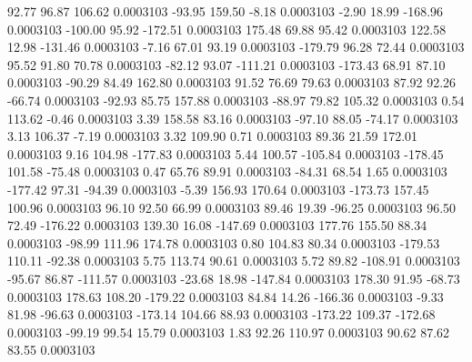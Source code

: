        92.77       96.87      106.62     0.0003103
      -93.95      159.50       -8.18     0.0003103
       -2.90       18.99     -168.96     0.0003103
     -100.00       95.92     -172.51     0.0003103
      175.48       69.88       95.42     0.0003103
      122.58       12.98     -131.46     0.0003103
       -7.16       67.01       93.19     0.0003103
     -179.79       96.28       72.44     0.0003103
       95.52       91.80       70.78     0.0003103
      -82.12       93.07     -111.21     0.0003103
     -173.43       68.91       87.10     0.0003103
      -90.29       84.49      162.80     0.0003103
       91.52       76.69       79.63     0.0003103
       87.92       92.26      -66.74     0.0003103
      -92.93       85.75      157.88     0.0003103
      -88.97       79.82      105.32     0.0003103
        0.54      113.62       -0.46     0.0003103
        3.39      158.58       83.16     0.0003103
      -97.10       88.05      -74.17     0.0003103
        3.13      106.37       -7.19     0.0003103
        3.32      109.90        0.71     0.0003103
       89.36       21.59      172.01     0.0003103
        9.16      104.98     -177.83     0.0003103
        5.44      100.57     -105.84     0.0003103
     -178.45      101.58      -75.48     0.0003103
        0.47       65.76       89.91     0.0003103
      -84.31       68.54        1.65     0.0003103
     -177.42       97.31      -94.39     0.0003103
       -5.39      156.93      170.64     0.0003103
     -173.73      157.45      100.96     0.0003103
       96.10       92.50       66.99     0.0003103
       89.46       19.39      -96.25     0.0003103
       96.50       72.49     -176.22     0.0003103
      139.30       16.08     -147.69     0.0003103
      177.76      155.50       88.34     0.0003103
      -98.99      111.96      174.78     0.0003103
        0.80      104.83       80.34     0.0003103
     -179.53      110.11      -92.38     0.0003103
        5.75      113.74       90.61     0.0003103
        5.72       89.82     -108.91     0.0003103
      -95.67       86.87     -111.57     0.0003103
      -23.68       18.98     -147.84     0.0003103
      178.30       91.95      -68.73     0.0003103
      178.63      108.20     -179.22     0.0003103
       84.84       14.26     -166.36     0.0003103
       -9.33       81.98      -96.63     0.0003103
     -173.14      104.66       88.93     0.0003103
     -173.22      109.37     -172.68     0.0003103
      -99.19       99.54       15.79     0.0003103
        1.83       92.26      110.97     0.0003103
       90.62       87.62       83.55     0.0003103
